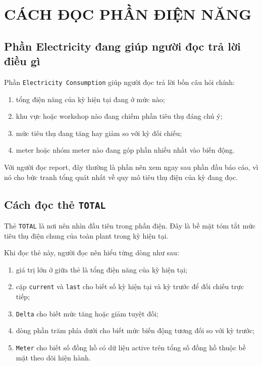 \chapter{CÁCH ĐỌC PHẦN ĐIỆN NĂNG}

\section{Phần Electricity đang giúp người đọc trả lời điều gì}

Phần \texttt{Electricity Consumption} giúp người đọc trả lời bốn câu hỏi chính:

\begin{enumerate}[label=-]
\item tổng điện năng của kỳ hiện tại đang ở mức nào;
\item khu vực hoặc workshop nào đang chiếm phần tiêu thụ đáng chú ý;
\item mức tiêu thụ đang tăng hay giảm so với kỳ đối chiếu;
\item meter hoặc nhóm meter nào đang góp phần nhiều nhất vào biến động.
\end{enumerate}

Với người đọc report, đây thường là phần nên xem ngay sau phần đầu báo cáo, vì nó cho bức tranh tổng quát nhất về quy mô tiêu thụ điện của kỳ đang đọc.

\section{Cách đọc thẻ \texttt{TOTAL}}

Thẻ \texttt{TOTAL} là nơi nên nhìn đầu tiên trong phần điện. Đây là bề mặt tóm tắt mức tiêu thụ điện chung của toàn plant trong kỳ hiện tại.

Khi đọc thẻ này, người đọc nên hiểu từng dòng như sau:

\begin{enumerate}[label=-]
\item giá trị lớn ở giữa thẻ là tổng điện năng của kỳ hiện tại;
\item cặp \texttt{current} và \texttt{last} cho biết số kỳ hiện tại và kỳ trước để đối chiếu trực tiếp;
\item \texttt{Delta} cho biết mức tăng hoặc giảm tuyệt đối;
\item dòng phần trăm phía dưới cho biết mức biến động tương đối so với kỳ trước;
\item \texttt{Meter} cho biết số đồng hồ có dữ liệu active trên tổng số đồng hồ thuộc bề mặt theo dõi hiện hành.
\end{enumerate}

